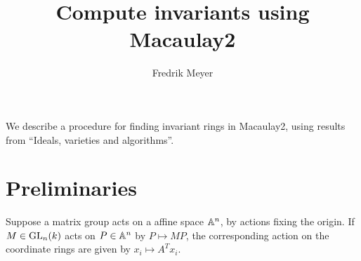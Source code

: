 \documentclass[11pt, english]{article}
\begin{document}
\title{Compute invariants using Macaulay2}
\author{Fredrik Meyer}
\maketitle 

We describe a procedure for finding invariant rings in Macaulay2, using results from ``Ideals, varieties and algorithms''.

\section{Preliminaries}

Suppose a matrix group acts on a affine space $\mathbb{A}^n$, by actions fixing the origin. If $M \in \operatorname{GL}_n(k)$ acts on $P \in \mathbb{A}^n$ by $P \mapsto MP$, the corresponding action on the coordinate rings are given by $x_i \mapsto A^T x_i$. 
\end{document}
